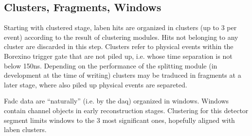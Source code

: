 \subsection{Clusters, Fragments, Windows}

Starting with clustered stage, laben hits are organized in clusters (up to 3 per event) according to the result of clustering modules.
Hits not belonging to any cluster are discarded in this step. 
Clusters refer to physical events within the Borexino trigger gate that are not piled up, i.e. whose time separation is not below 150ns.
Depending on the performance of the splitting module (in development at the time of writing) clusters may be traduced in fragments at a later stage, where also piled up physical events are separeted.

Fadc data are ``naturally'' (i.e. by the daq) organized in windows. 
Windows contain channel objects in early reconstruction stages. 
Clustering for this detector segment limits windows to the 3 most significant ones, hopefully aligned with laben clusters. 
